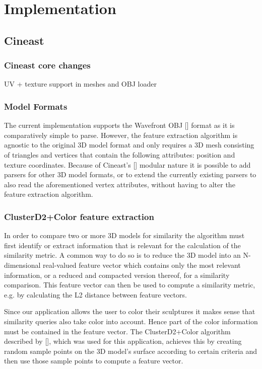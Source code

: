 \chapter{Implementation}

\section{Cineast}

\subsection{Cineast core changes}
UV + texture support in meshes and OBJ loader

\subsection{Model Formats}

The current implementation supports the Wavefront OBJ [] format as it is comparatively
simple to parse. However, the feature extraction algorithm is agnostic to the original 3D model format and only requires
a 3D mesh consisting of triangles and vertices that contain the following attributes: position and texture coordinates.
Because of Cineast's [] modular nature it is possible to add parsers for other 3D model formats, or
to extend the currently existing parsers to also read the aforementioned vertex attributes, without having to alter
the feature extraction algorithm.

\subsection{ClusterD2+Color feature extraction}


In order to compare two or more 3D models for similarity the algorithm must first identify or
extract information that is relevant for the calculation of the similarity metric.
A common way to do so is to reduce the 3D model into an N-dimensional real-valued feature vector which
contains only the most relevant information, or a reduced and compacted version thereof, for a similarity comparison. This feature vector can
then be used to compute a similarity metric, e.g. by calculating the L2 distance between feature vectors.

Since our application allows the user to color their sculptures it makes sense that similarity queries also
take color into account. Hence part of the color information must be contained in the feature vector.
The ClusterD2+Color algorithm described by [], which was used for this application,
achieves this by creating random sample points on the 3D model's surface according to certain criteria and then
use those sample points to compute a feature vector.

